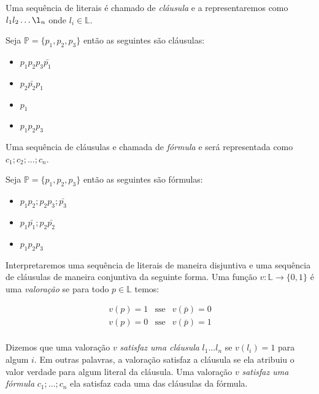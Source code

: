 Uma sequência de literais é chamado de {\em cláusula} e a representaremos como $l_1l_2\dots\l_n$ onde $l_i \in \mathbb{L}$.


\begin{example}
  Seja $\mathbb{P} = \{p_1, p_2, p_3\}$ então as seguintes são cláusulas:
\begin{itemize}
\item[] $p_1p_2p_3\bar{p_1}$
\item[] $p_2\bar{p_2}p_1$
\item[] $p_1$
\item[] $p_1p_2p_3$
\end{itemize}
\end{example}
 
Uma sequência de cláusulas e chamada de {\em fórmula} e será representada como $c_1;c_2;\dots;c_n$.

\begin{example}
  Seja $\mathbb{P} = \{p_1, p_2, p_3\}$ então as seguintes são fórmulas:
\begin{itemize}
\item[] $p_1p_2;p_2p_3;\bar{p_3}$
\item[] $p_1\bar{p_1};p_2\bar{p_2}$
\item[] $p_1p_2p_3$
\end{itemize}
\end{example}
 
Interpretaremos uma sequência de literais de maneira disjuntiva e uma sequência de cláusulas de maneira conjuntiva da seguinte forma.
Uma função $v: \mathbb{L} \to \{0,1\}$ é uma {\em valoração} se para todo $p \in \mathbb{L}$ temos:

\begin{eqnarray*}
  v(p) = 1 & \textrm{sse} & v(\bar{p}) = 0\\
  v(p) = 0 & \textrm{sse} & v(\bar{p}) = 1\\
\end{eqnarray*}

Dizemos que uma valoração $v$ {\em satisfaz uma cláusula} $l_1 \dots l_n$ se $v(l_i) = 1$ para algum $i$.
Em outras palavras, a valoração satisfaz a cláusula se ela atribuiu o valor verdade para algum literal da cláusula.
Uma valoração $v$ {\em satisfaz uma fórmula} $c_1; \dots; c_n$ ela satisfaz cada uma das cláusulas da fórmula.


